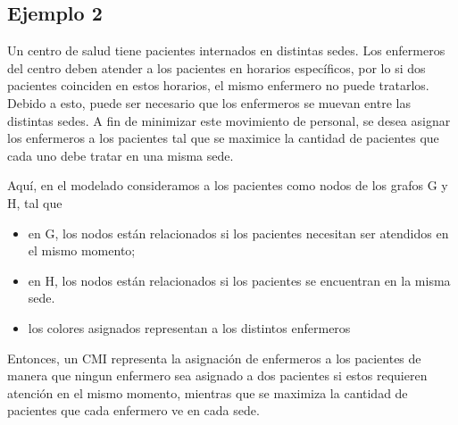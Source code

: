 \subsection{Ejemplo 2}
Un centro de salud tiene pacientes internados en distintas sedes.
Los enfermeros del centro deben atender a los pacientes en horarios espec\'ificos, por lo si dos pacientes coinciden en estos horarios, el mismo enfermero no puede tratarlos. Debido a esto, puede ser necesario que los enfermeros se muevan entre las distintas sedes.
A fin de minimizar este movimiento de personal, se desea asignar los enfermeros a los pacientes tal que se maximice la cantidad de pacientes que cada uno debe tratar en una misma sede.

Aqu\'i, en el modelado consideramos a los pacientes como nodos de los grafos G y H, tal que 
\begin{itemize}
	\item en G, los nodos est\'an relacionados si los pacientes necesitan ser atendidos en el mismo momento;
	\item en H, los nodos est\'an relacionados si los pacientes se encuentran en la misma sede.  
	\item los colores asignados representan a los distintos enfermeros
\end{itemize}
Entonces, un CMI representa la asignaci\'on de enfermeros a los pacientes de manera que ningun enfermero sea asignado a dos pacientes si estos requieren atenci\'on en el mismo momento, mientras que se maximiza la cantidad de pacientes que cada enfermero ve en cada sede. 
